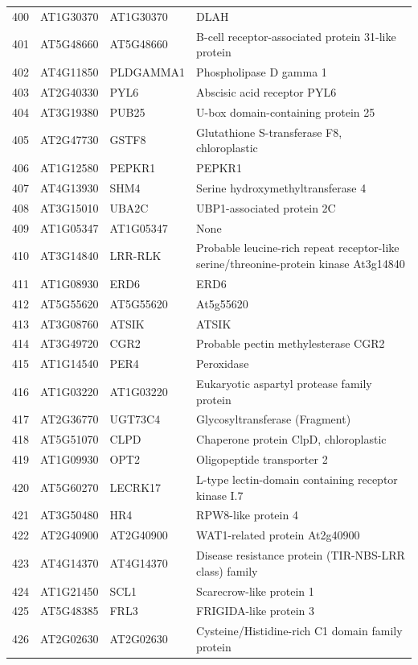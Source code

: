 \documentclass[11pt]{article}
\begin{document}
\begin{center}
\begin{tabular}{rlll}
400 & AT1G30370 & AT1G30370 & DLAH\\
401 & AT5G48660 & AT5G48660 & B-cell receptor-associated protein 31-like protein\\
402 & AT4G11850 & PLDGAMMA1 & Phospholipase D gamma 1\\
403 & AT2G40330 & PYL6 & Abscisic acid receptor PYL6\\
404 & AT3G19380 & PUB25 & U-box domain-containing protein 25\\
405 & AT2G47730 & GSTF8 & Glutathione S-transferase F8, chloroplastic\\
406 & AT1G12580 & PEPKR1 & PEPKR1\\
407 & AT4G13930 & SHM4 & Serine hydroxymethyltransferase 4\\
408 & AT3G15010 & UBA2C & UBP1-associated protein 2C\\
409 & AT1G05347 & AT1G05347 & None\\
410 & AT3G14840 & LRR-RLK & Probable leucine-rich repeat receptor-like serine/threonine-protein kinase At3g14840\\
411 & AT1G08930 & ERD6 & ERD6\\
412 & AT5G55620 & AT5G55620 & At5g55620\\
413 & AT3G08760 & ATSIK & ATSIK\\
414 & AT3G49720 & CGR2 & Probable pectin methylesterase CGR2\\
415 & AT1G14540 & PER4 & Peroxidase\\
416 & AT1G03220 & AT1G03220 & Eukaryotic aspartyl protease family protein\\
417 & AT2G36770 & UGT73C4 & Glycosyltransferase (Fragment)\\
418 & AT5G51070 & CLPD & Chaperone protein ClpD, chloroplastic\\
419 & AT1G09930 & OPT2 & Oligopeptide transporter 2\\
420 & AT5G60270 & LECRK17 & L-type lectin-domain containing receptor kinase I.7\\
421 & AT3G50480 & HR4 & RPW8-like protein 4\\
422 & AT2G40900 & AT2G40900 & WAT1-related protein At2g40900\\
423 & AT4G14370 & AT4G14370 & Disease resistance protein (TIR-NBS-LRR class) family\\
424 & AT1G21450 & SCL1 & Scarecrow-like protein 1\\
425 & AT5G48385 & FRL3 & FRIGIDA-like protein 3\\
426 & AT2G02630 & AT2G02630 & Cysteine/Histidine-rich C1 domain family protein\\

\end{tabular}
\end{center}
\end{document}
